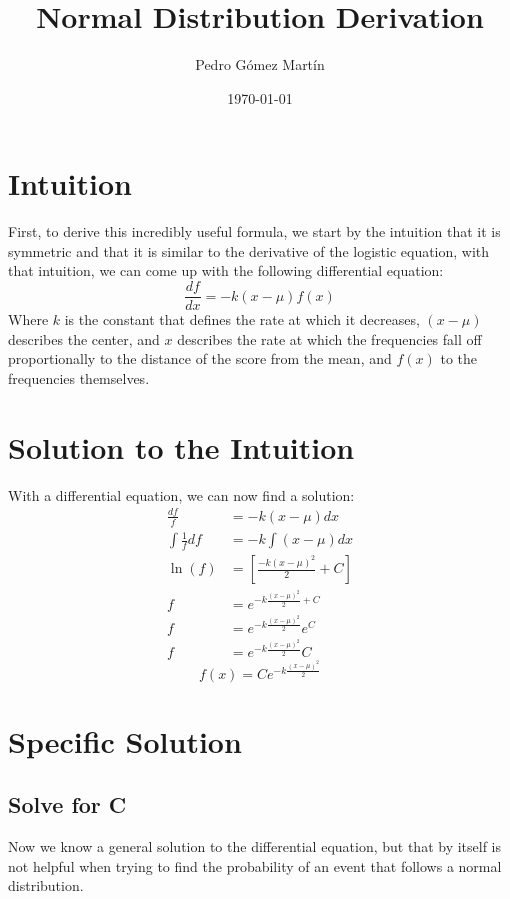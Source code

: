 \documentclass{article}
\author{Pedro G\'{o}mez Mart\'{i}n}
\date{\today}
\title{Normal Distribution Derivation}
\begin{document}
\maketitle
\tableofcontents

\section{Intuition}

First, to derive this incredibly useful formula, we start by the intuition that
it is symmetric and that it is similar to the derivative of the logistic
equation, with that intuition, we can come up with the following differential
equation:
\begin{equation}
  \label{eq:Differential equation intuition}
  \frac{df}{dx}=-k(x-\mu)f(x)
\end{equation}
Where $k$ is the constant that defines the rate at which it decreases, $(x-\mu)$
describes the center, and $x$ describes the rate at which the frequencies
fall off proportionally to the distance of the score from the mean, and $f(x)$
to the frequencies themselves.

\section{Solution to the Intuition}
With a differential equation, we can now find a solution:
\begin{align}
  \frac{df}{f}&=-k(x-\mu)dx\\
  \int\frac{1}{f}df&=-k\int (x-\mu)dx\\
  \ln (f)&=\left[ \frac{-k(x-\mu)^2}{2} +C \right]\\
  f&=e^{-k\frac{\left(x-\mu\right)^2}{2}+C}\\
  f&=e^{-k\frac{\left(x-\mu\right)^2}{2}}e^C\\
  f&=e^{-k\frac{\left(x-\mu\right)^2}{2}}C
\end{align}
\begin{equation*}
  \label{eq:General Solution}
  f(x)=Ce^{-k\frac{\left(x-\mu\right)^2}{2}}
\end{equation*}

\section{Specific Solution}
\subsection{Solve for C}
Now we know a general solution to the differential equation, but that by itself
is not helpful when trying to find the probability of an event that follows a
normal distribution.
\end{document}
